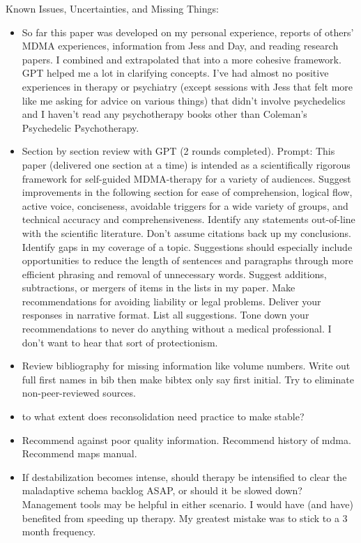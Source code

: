 \documentclass[12pt,letterpaper]{article}
\begin{document}
Known Issues, Uncertainties, and Missing Things:
\begin{itemize}
    \item So far this paper was developed on my personal experience, reports of others' MDMA experiences, information from Jess and Day, and reading research papers. I combined and extrapolated that into a more cohesive framework. GPT helped me a lot in clarifying concepts. I've had almost no positive experiences in therapy or psychiatry (except sessions with Jess that felt more like me asking for advice on various things) that didn't involve psychedelics and I haven't read any psychotherapy books other than Coleman's Psychedelic Psychotherapy.
    \item Section by section review with GPT (2 rounds completed). Prompt:
        This paper (delivered one section at a time) is intended as a scientifically rigorous framework for self-guided MDMA-therapy for a variety of audiences.
        Suggest improvements in the following section for ease of comprehension, logical flow, active voice, conciseness, avoidable triggers for a wide variety of groups, and technical accuracy and comprehensiveness.
        Identify any statements out-of-line with the scientific literature. Don't assume citations back up my conclusions. Identify gaps in my coverage of a topic.
        Suggestions should especially include opportunities to reduce the length of sentences and paragraphs through more efficient phrasing and removal of unnecessary words.
        Suggest additions, subtractions, or mergers of items in the lists in my paper.
        Make recommendations for avoiding liability or legal problems.
        Deliver your responses in narrative format. List all suggestions.
        Tone down your recommendations to never do anything without a medical professional. I don't want to hear that sort of protectionism.
    \item Review bibliography for missing information like volume numbers. Write out full first names in bib then make bibtex only say first initial. Try to eliminate non-peer-reviewed sources.
    \item to what extent does reconsolidation need practice to make stable?
    \item Recommend against poor quality information. Recommend history of mdma. Recommend maps manual.
    \item If destabilization becomes intense, should therapy be intensified to clear the maladaptive schema backlog ASAP, or should it be slowed down? Management tools may be helpful in either scenario. I would have (and have) benefited from speeding up therapy. My greatest mistake was to stick to a 3 month frequency.

\end{itemize}
\end{document}
